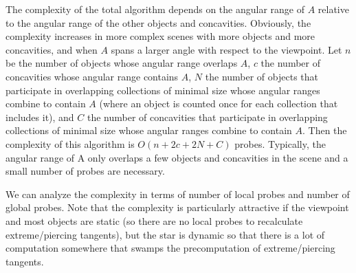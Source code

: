 \documentclass[10pt,twocolumn]{article}
\newcommand{\Comment}[1]{\relax}  %
\newif\ifJournal
\begin{document}
{The complexity of the total algorithm depends on the angular range of $A$ relative
to the angular range of the other objects and concavities.
Obviously, the complexity increases in more complex scenes with more objects and more 
concavities, and when $A$ spans a larger angle with respect to the viewpoint.
Let $n$ be the number of objects whose angular range overlaps $A$,
$c$ the number of concavities whose angular range contains $A$,
$N$ the number of objects that participate in overlapping collections of minimal size
whose angular ranges combine to contain $A$ (where an object is counted once for each
collection that includes it),
and $C$ the number of concavities that participate in overlapping collections
of minimal size whose angular ranges combine to contain $A$.
Then the complexity of this algorithm is $O(n+2c+2N+C)$ probes.
Typically, the angular range of A only overlaps a few objects and concavities
in the scene and a small number of probes are necessary.
\ifJournal %
ESTABLISH SOME EXPERIMENTAL RESULTS ON NUMBERS OF PROBES.
\fi

We can analyze the complexity in terms of number of local probes and number of global
probes.
Note that the complexity is particularly attractive if the viewpoint and most objects
are static (so there are no local probes to recalculate extreme/piercing tangents),
but the star is dynamic so that there is a lot of computation
somewhere that swamps the precomputation of extreme/piercing tangents.

\ifJournal %
This suggests test data of detecting visibility of a moving object.
\fi

\ifJournal %
Implementation improvement:
lazily compute concavities, angular ranges, etc. on demand: only a few objects are
probed and then need more information computed.
\fi



} %
\end{document}

